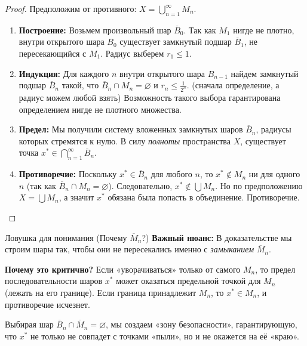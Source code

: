 \begin{proof}
	Предположим от противного: $X = \bigcup_{n=1}^{\infty} M_n$.
	\begin{enumerate}
		\item \textbf{Построение:} 
		Возьмем произвольный шар $\overline{B}_0$. 
		Так как $M_1$ нигде не плотно, внутри открытого шара $B_0$ существует замкнутый подшар $\overline{B}_1$, не пересекающийся с $M_1$. Радиус выберем $r_1 \leqslant 1$.
		
		\item \textbf{Индукция:} 
		Для каждого $n$ внутри открытого шара $B_{n-1}$ найдем замкнутый подшар $\overline{B}_n$ такой, что $\overline{B}_n \cap M_n = \varnothing$ и $r_n \leqslant \frac{1}{2^n}$. (сначала определение, а радиус можем любой взять) Возможность такого выбора гарантирована определением нигде не плотного множества.
		
		\item \textbf{Предел:} 
		Мы получили систему вложенных замкнутых шаров $\overline{B}_n$, радиусы которых стремятся к нулю. В силу \textit{полноты} пространства $X$, существует точка $x^* \in \bigcap_{n=1}^{\infty} \overline{B}_n$.
		
		\item \textbf{Противоречие:} 
		Поскольку $x^* \in \overline{B}_n$ для любого $n$, то $x^* \notin M_n$ ни для одного $n$ (так как $\overline{B}_n \cap M_n = \varnothing$). Следовательно, $x^* \notin \bigcup M_n$. 
		Но по предположению $X = \bigcup M_n$, а значит $x^*$ обязана была попасть в объединение. Противоречие.
	\end{enumerate}
\end{proof}

\begin{idea}{Ловушка для понимания (Почему $\overline{M}_n$?)}
	\textbf{Важный нюанс:} В доказательстве мы строим шары так, чтобы они не пересекались именно с \textit{замыканием} $\overline{M}_n$. 
	
	\textbf{Почему это критично?} Если «уворачиваться» только от самого $M_n$, то предел последовательности шаров $x^*$ может оказаться предельной точкой для $M_n$ (лежать на его границе). Если граница принадлежит $M_n$, то $x^* \in M_n$, и противоречие исчезнет. 
	
	Выбирая шар $\overline{B}_n \cap \overline{M}_n = \varnothing$, мы создаем «зону безопасности», гарантирующую, что $x^*$ не только не совпадет с точками «пыли», но и не окажется на её «краю».
\end{idea}
